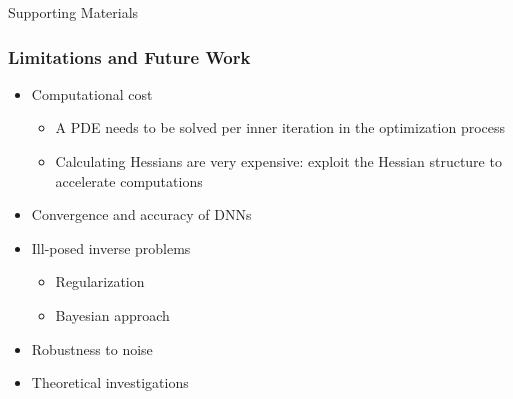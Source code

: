 \documentclass[usenames,dvipsnames]{beamer}
\begin{document}
\begin{frame}
	\LARGE
	\begin{center}
		Supporting Materials
	\end{center}
\end{frame}

\begin{frame}
	\frametitle{Limitations and Future Work}
	\begin{itemize}
		\item Computational cost
		\begin{itemize}
			\item A PDE needs to be solved per inner iteration in the optimization process
			\item Calculating Hessians are very expensive: exploit the Hessian structure to accelerate computations
		\end{itemize}
		\item Convergence and accuracy of DNNs
		\item Ill-posed inverse problems
		\begin{itemize}
			\item Regularization 
			\item Bayesian approach
		\end{itemize}
		\item Robustness to noise 
		\item Theoretical investigations
	\end{itemize}
\end{frame}
\end{document}
